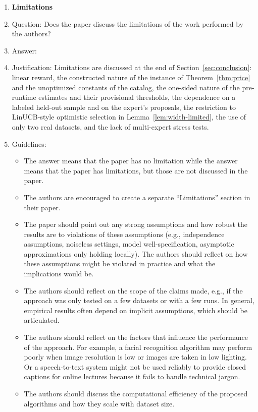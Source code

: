 \documentclass{article}
\theoremstyle{definition}
\theoremstyle{remark}
\theoremstyle{remark}
\begin{document}
\begin{enumerate}
\item {\bf Limitations}
    \item[] Question: Does the paper discuss the limitations of the work performed by the authors?
    \item[] Answer: \answerYes{} %
    \item[] Justification: Limitations are discussed at the end of Section~\ref{sec:conclusion}: linear reward, the constructed nature of the instance of Theorem~\ref{thm:price} and the unoptimized constants of the catalog, the one-sided nature of the pre-runtime estimates and their provisional thresholds, the dependence on a labeled held-out sample and on the expert's proposals, the restriction to LinUCB-style optimistic selection in Lemma~\ref{lem:width-limited}, the use of only two real datasets, and the lack of multi-expert stress tests.
    \item[] Guidelines:
    \begin{itemize}
        \item The answer \answerNA{} means that the paper has no limitation while the answer \answerNo{} means that the paper has limitations, but those are not discussed in the paper. 
        \item The authors are encouraged to create a separate ``Limitations'' section in their paper.
        \item The paper should point out any strong assumptions and how robust the results are to violations of these assumptions (e.g., independence assumptions, noiseless settings, model well-specification, asymptotic approximations only holding locally). The authors should reflect on how these assumptions might be violated in practice and what the implications would be.
        \item The authors should reflect on the scope of the claims made, e.g., if the approach was only tested on a few datasets or with a few runs. In general, empirical results often depend on implicit assumptions, which should be articulated.
        \item The authors should reflect on the factors that influence the performance of the approach. For example, a facial recognition algorithm may perform poorly when image resolution is low or images are taken in low lighting. Or a speech-to-text system might not be used reliably to provide closed captions for online lectures because it fails to handle technical jargon.
        \item The authors should discuss the computational efficiency of the proposed algorithms and how they scale with dataset size.

\end{itemize}
\end{enumerate}
\end{document}
